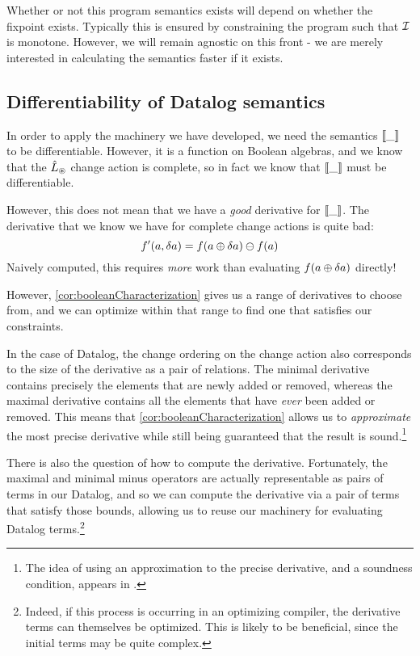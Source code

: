 Whether or not this program semantics exists will depend on whether the fixpoint
exists. Typically this is ensured by constraining the program such that $\mathcal{I}$
is monotone. However, we will remain agnostic on this front - we are merely
interested in calculating the semantics faster if it exists.

\subsection{Differentiability of Datalog semantics}
\label{sec:datalogDifferentiability}

In order to apply the machinery we have developed, we need the semantics $\llbracket \_ \rrbracket$ to
be differentiable. However, it is a function on Boolean algebras, and we know
that the $\hat{L}_\circledast$ change action is complete, so in fact we know that
$\llbracket \_ \rrbracket$ must be differentiable.

However, this does not mean that we have a \emph{good} derivative for
$\llbracket \_ \rrbracket$. The derivative that we know we have for complete change actions
is quite bad:
$$f'(a, \delta a) = f(a \oplus \delta a) \ominus f(a)$$
Naively computed, this requires \emph{more} work than evaluating $f(a \oplus \delta a)$ directly!

However, \cref{cor:booleanCharacterization} gives us a range of derivatives to
choose from, and we can optimize within that range to find one that satisfies
our constraints.

In the case of Datalog, the change ordering on the change action also
corresponds to the size of the derivative as a pair of relations. The minimal
derivative contains precisely the elements that are newly added or removed,
whereas the maximal derivative contains all the elements that have \emph{ever}
been added or removed. This means that \cref{cor:booleanCharacterization} allows
us to \emph{approximate} the most precise derivative while still being
guaranteed that the result is sound.\footnote{The idea of using an approximation
to the precise derivative, and a soundness condition, appears in \textcite{bancilhon1986amateur}.}

There is also the question of how to compute the derivative. Fortunately, the
maximal and minimal minus operators are actually representable as pairs of terms
in our Datalog, and so we can compute the derivative via a pair of terms that
satisfy those bounds, allowing us to reuse our machinery for evaluating Datalog
terms.\footnote{Indeed, if this process is occurring in an optimizing compiler,
  the derivative terms can themselves be optimized. This is likely to be
  beneficial, since the initial terms may be quite complex.}


